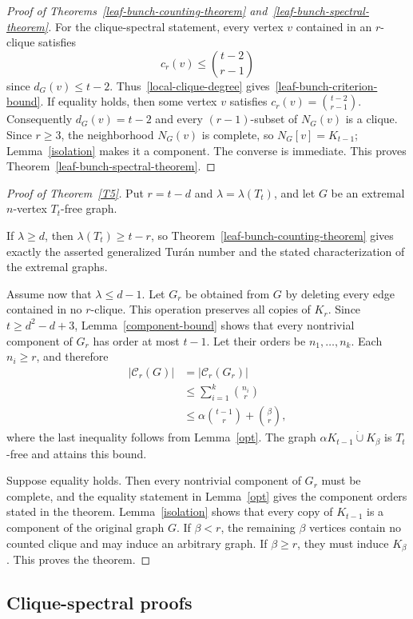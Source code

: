 \documentclass[11pt,a4paper]{article}
\newcommand{\dunion}{\mathbin{\dot\cup}}
\begin{document}
\begin{proof}[Proof of Theorems~\ref{leaf-bunch-counting-theorem} and~\ref{leaf-bunch-spectral-theorem}]
For the clique-spectral statement, every vertex $v$ contained in an $r$-clique satisfies
\[
c_r(v)\le\binom{t-2}{r-1}
\]
since $d_G(v)\le t-2$.
Thus~\eqref{local-clique-degree} gives~\eqref{leaf-bunch-criterion-bound}. If equality holds, then some vertex $v$ satisfies $c_r(v)=\binom{t-2}{r-1}$. Consequently $d_G(v)=t-2$ and every $(r-1)$-subset of $N_G(v)$ is a clique. Since $r\ge3$, the neighborhood $N_G(v)$ is complete, so $N_G[v]=K_{t-1}$; Lemma~\ref{isolation} makes it a component. The converse is immediate. This proves Theorem~\ref{leaf-bunch-spectral-theorem}.
\end{proof}

\begin{proof}[Proof of Theorem~\ref{T5}]
Put $r=t-d$ and $\lambda=\lambda(T_t)$, and let $G$ be an extremal $n$-vertex $T_t$-free graph.

If $\lambda\ge d$, then $\lambda(T_t)\ge t-r$, so Theorem~\ref{leaf-bunch-counting-theorem} gives exactly the asserted generalized Tur\'{a}n number and the stated characterization of the extremal graphs.

Assume now that $\lambda\le d-1$. Let $G_r$ be obtained from $G$ by deleting every edge contained in no $r$-clique. This operation preserves all copies of $K_r$. Since $t\ge d^2-d+3$, Lemma~\ref{component-bound} shows that every nontrivial component of $G_r$ has order at most $t-1$. Let their orders be $n_1,\ldots,n_k$. Each $n_i\ge r$, and therefore
\[
\begin{aligned}
|\mathcal C_r(G)|
&=|\mathcal C_r(G_r)|\\
&\le\sum_{i=1}^k\binom{n_i}{r}\\
&\le\alpha\binom{t-1}{r}+\binom{\beta}{r},
\end{aligned}
\]
where the last inequality follows from Lemma~\ref{opt}. The graph $\alpha K_{t-1}\dunion K_\beta$ is $T_t$-free and attains this bound.

Suppose equality holds. Then every nontrivial component of $G_r$ must be complete, and the equality statement in Lemma~\ref{opt} gives the component orders stated in the theorem. Lemma~\ref{isolation} shows that every copy of $K_{t-1}$ is a component of the original graph $G$. If $\beta<r$, the remaining $\beta$ vertices contain no counted clique and may induce an arbitrary graph. If $\beta\ge r$, they must induce $K_\beta$. This proves the theorem.
\end{proof}



\subsection{Clique-spectral proofs}\label{spectral-proofs}
\end{document}
